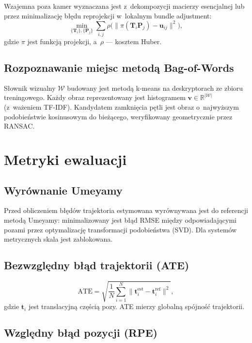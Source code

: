 Wzajemna poza kamer wyznaczana jest z~dekompozycji macierzy esencjalnej
lub przez minimalizację błędu reprojekcji w~lokalnym bundle adjustment:
\begin{equation}
    \min_{\{\mathbf{T}_i\}, \{\mathbf{P}_j\}}
    \sum_{i,j} \rho\bigl(\| \pi(\mathbf{T}_i \mathbf{P}_j) - \mathbf{u}_{ij} \|^2\bigr),
\end{equation}
gdzie $\pi$ jest funkcją projekcji, a~$\rho$ --- kosztem Huber.

\subsection{Rozpoznawanie miejsc metodą Bag-of-Words}

Słownik wizualny $\mathcal{W}$ budowany jest metodą k-means na deskryptorach
ze zbioru treningowego.
Każdy obraz reprezentowany jest histogramem $\mathbf{v} \in \mathbb{R}^{|\mathcal{W}|}$
(z~ważeniem TF-IDF).
Kandydatem zamknięcia pętli jest obraz o~najwyższym podobieństwie kosinusowym
do bieżącego, weryfikowany geometrycznie przez RANSAC.

\section{Metryki ewaluacji}

\subsection{Wyrównanie Umeyamy}

Przed obliczeniem błędów trajektoria estymowana wyrównywana jest do referencji
metodą Umeyamy: minimalizowany jest błąd RMSE między odpowiadającymi pozami
przez optymalizację transformacji podobieństwa (SVD).
Dla systemów metrycznych skala jest zablokowana.

\subsection{Bezwzględny błąd trajektorii (ATE)}

\begin{equation}
    \mathrm{ATE} = \sqrt{\frac{1}{N}\sum_{i=1}^{N}
    \| \mathbf{t}_i^{\mathrm{est}} - \mathbf{t}_i^{\mathrm{ref}} \|^2},
\end{equation}
gdzie $\mathbf{t}_i$ jest translacyjną częścią pozy.
ATE mierzy globalną spójność trajektorii.

\subsection{Względny błąd pozycji (RPE)}

